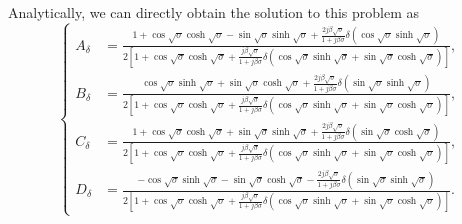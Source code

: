 \documentclass{article}
\begin{document}
Analytically, we can directly obtain the solution to this problem as 
\begin{equation}
    \left\{\begin{aligned}
        A_\delta &= \frac{ 1 + \cos\sqrt{\sigma } \cosh\sqrt{\sigma } - \sin\sqrt{\sigma } \sinh\sqrt{\sigma} + \frac{2 j \beta \sqrt{\sigma}}{ 1+ j \beta \sigma } \delta \left( \cos\sqrt{\sigma } \sinh\sqrt{\sigma } \right)}{2 \left[ 1 + \cos\sqrt{\sigma } \cosh\sqrt{\sigma } + \frac{j \beta \sqrt{\sigma}}{ 1+ j \beta \sigma } \delta \left( \cos\sqrt{\sigma } \sinh\sqrt{\sigma } + \sin\sqrt{\sigma } \cosh\sqrt{\sigma } \right) \right]}, \\
        B_\delta &= \frac{ \cos\sqrt{\sigma } \sinh\sqrt{\sigma } + \sin\sqrt{\sigma } \cosh\sqrt{\sigma} + \frac{2 j \beta \sqrt{\sigma}}{ 1+ j \beta \sigma } \delta \left( \sin\sqrt{\sigma } \sinh\sqrt{\sigma } \right)}{2 \left[ 1 + \cos\sqrt{\sigma } \cosh\sqrt{\sigma } + \frac{j \beta \sqrt{\sigma}}{ 1+ j \beta \sigma } \delta \left( \cos\sqrt{\sigma } \sinh\sqrt{\sigma } + \sin\sqrt{\sigma } \cosh\sqrt{\sigma } \right) \right]}, \\
        C_\delta &= \frac{ 1 + \cos\sqrt{\sigma } \cosh\sqrt{\sigma } + \sin\sqrt{\sigma } \sinh\sqrt{\sigma} + \frac{2 j \beta \sqrt{\sigma}}{ 1+ j \beta \sigma } \delta \left( \sin\sqrt{\sigma } \cosh\sqrt{\sigma } \right)}{2 \left[ 1 + \cos\sqrt{\sigma } \cosh\sqrt{\sigma } + \frac{j \beta \sqrt{\sigma}}{ 1+ j \beta \sigma } \delta \left( \cos\sqrt{\sigma } \sinh\sqrt{\sigma } + \sin\sqrt{\sigma } \cosh\sqrt{\sigma } \right) \right]}, \\
        D_\delta &= \frac{ -\cos\sqrt{\sigma } \sinh\sqrt{\sigma } - \sin\sqrt{\sigma } \cosh\sqrt{\sigma} -  \frac{2 j \beta \sqrt{\sigma}}{ 1+ j \beta \sigma } \delta \left( \sin\sqrt{\sigma } \sinh\sqrt{\sigma } \right)}{2 \left[ 1 + \cos\sqrt{\sigma } \cosh\sqrt{\sigma } + \frac{j \beta \sqrt{\sigma}}{ 1+ j \beta \sigma } \delta \left( \cos\sqrt{\sigma } \sinh\sqrt{\sigma } + \sin\sqrt{\sigma } \cosh\sqrt{\sigma } \right) \right]}.
    \end{aligned}\right.
    \label{eq:eq_disp_func_coeffs_exps}
\end{equation}
\end{document}
